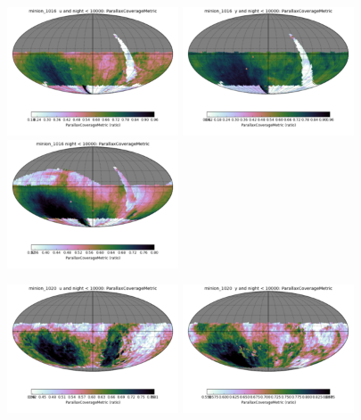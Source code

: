 \begin{figure}[ht]
  \begin{center}
  \includegraphics[width=2.0in]{./figs/milkyway/astromPanels/MW_Astrom_paCovge_Baseline_u_map.png}
  \includegraphics[width=2.0in]{./figs/milkyway/astromPanels/MW_Astrom_paCovge_Baseline_y_map.png}
  \includegraphics[width=2.0in]{./figs/milkyway/astromPanels/MW_Astrom_paCovge_Baseline_10y_map.png}
  \end{center}
  \begin{center}
  \includegraphics[width=2.0in]{./figs/milkyway/astromPanels/MW_Astrom_paCovge_PanSTARRS_u_map.png}
  \includegraphics[width=2.0in]{./figs/milkyway/astromPanels/MW_Astrom_paCovge_PanSTARRS_y_map.png}

\end{center}
\end{figure}

